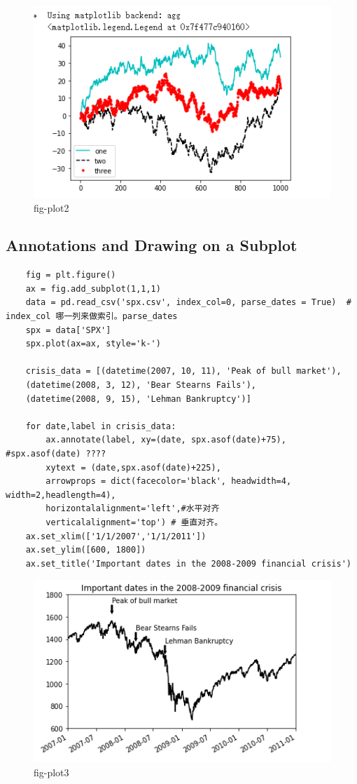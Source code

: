 \documentclass{article}
\begin{document}
\begin{figure}[tbhp]
	\centering
	\includegraphics[width=\linewidth]{fig/p2}
	\caption{fig-plot2}
	\label{fig-shili2}
\end{figure}

\subsection[在图像上标记]{Annotations and Drawing on a Subplot}
\begin{lstlisting}
	fig = plt.figure()
	ax = fig.add_subplot(1,1,1)
	data = pd.read_csv('spx.csv', index_col=0, parse_dates = True)  # index_col 哪一列来做索引。parse_dates 
	spx = data['SPX']
	spx.plot(ax=ax, style='k-')
	
	crisis_data = [(datetime(2007, 10, 11), 'Peak of bull market'),
	(datetime(2008, 3, 12), 'Bear Stearns Fails'),
	(datetime(2008, 9, 15), 'Lehman Bankruptcy')]
	
	for date,label in crisis_data:
		ax.annotate(label, xy=(date, spx.asof(date)+75),  #spx.asof(date) ????
		xytext = (date,spx.asof(date)+225),
		arrowprops = dict(facecolor='black', headwidth=4, width=2,headlength=4),
		horizontalalignment='left',#水平对齐 
		verticalalignment='top') # 垂直对齐。
	ax.set_xlim(['1/1/2007','1/1/2011'])
	ax.set_ylim([600, 1800])
	ax.set_title('Important dates in the 2008-2009 financial crisis')
\end{lstlisting}

\begin{figure}[tbhp]
	\centering
	\includegraphics[width=\linewidth]{fig/p3}
	\caption{fig-plot3}
	\label{fig-shili3}
\end{figure}
\end{document}
